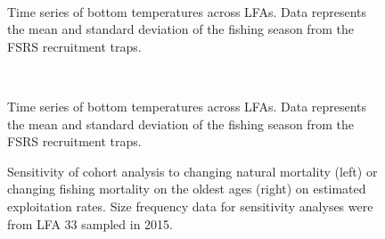 \documentclass[11pt]{article}
\newcommand{\e}{/SpinDr/backup/bio_data/bio.lobster/figures/} %
\begin{document}
\begin{landscape}
\begin{figure}
        \centering
         \\
                    
                    \caption{Time series of bottom temperatures across LFAs. Data represents the mean and standard deviation of the fishing season from the FSRS recruitment traps.}
        \end{figure}

\begin{figure}
        \centering
         \\
                    
                    \caption{Time series of bottom temperatures across LFAs. Data represents the mean and standard deviation of the fishing season from the FSRS recruitment traps.}
        \end{figure}

\end{landscape}




\begin{figure}
\centering
              \caption{Sensitivity of cohort analysis to changing natural mortality (left) or changing fishing mortality on the oldest ages (right) on estimated exploitation rates. Size frequency data for sensitivity analyses were from LFA 33 sampled in 2015.}
\end{figure}
\end{document}
